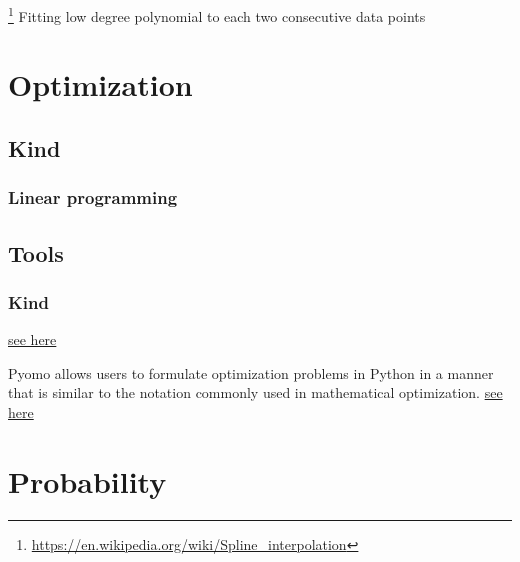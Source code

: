 \documentclass{book}
\newcommand{\seehere}[1]{\href{#1}{see here}}
\providecommand{\seehere}[1]{\href{#1}{see here}}
\providecommand{\seeherefooter}[1]{\footnote{\url{#1}}}
\begin{document}

\seeherefooter{https://en.wikipedia.org/wiki/Spline_interpolation}
    Fitting low degree polynomial to each two consecutive data points

\section{Optimization}

\subsection{Kind}

\subsubsection{Linear programming}


% 

\subsection{Tools}


% 

\subsubsection{Kind}


\seehere{https://en.wikipedia.org/wiki/GNU_Linear_Programming_Kit}


% 


Pyomo allows users to formulate optimization problems in Python in a manner that is similar to the notation commonly used in mathematical optimization. \seehere{https://en.wikipedia.org/wiki/Pyomo}

\section{Probability}
\end{document}

